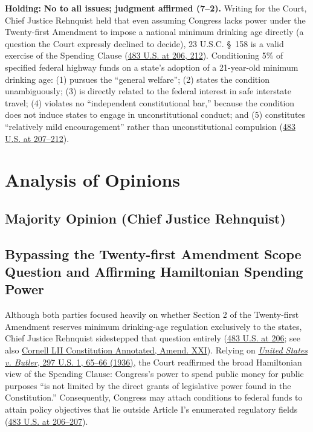 \documentclass[12pt]{article}
\begin{document}
\textbf{Holding:} \textbf{No to all issues; judgment affirmed (7--2).} Writing for the Court, Chief Justice Rehnquist held that even assuming Congress lacks power under the Twenty-first Amendment to impose a national minimum drinking age directly (a question the Court expressly declined to decide), 23 U.S.C. \S~158 is a valid exercise of the Spending Clause (\href{https://supreme.justia.com/cases/federal/us/483/203/}{483 U.S. at 206, 212}). Conditioning 5\% of specified federal highway funds on a state's adoption of a 21-year-old minimum drinking age: (1) pursues the ``general welfare''; (2) states the condition unambiguously; (3) is directly related to the federal interest in safe interstate travel; (4) violates no ``independent constitutional bar,'' because the condition does not induce states to engage in unconstitutional conduct; and (5) constitutes ``relatively mild encouragement'' rather than unconstitutional compulsion (\href{https://supreme.justia.com/cases/federal/us/483/203/}{483 U.S. at 207--212}).

\section{Analysis of Opinions}
\subsection{Majority Opinion (Chief Justice Rehnquist)}

\subsection{Bypassing the Twenty-first Amendment Scope Question and Affirming Hamiltonian Spending Power}

Although both parties focused heavily on whether Section 2 of the Twenty-first Amendment reserves minimum drinking-age regulation exclusively to the states, Chief Justice Rehnquist sidestepped that question entirely (\href{https://supreme.justia.com/cases/federal/us/483/203/}{483 U.S. at 206}; see also \href{https://www.law.cornell.edu/constitution-conan/amendment-21/state-and-federal-regulation-of-minimum-drinking-age}{Cornell LII Constitution Annotated, Amend. XXI}). Relying on \href{https://supreme.justia.com/cases/federal/us/297/1/}{\textit{United States v. Butler}, 297 U.S. 1, 65--66 (1936)}, the Court reaffirmed the broad Hamiltonian view of the Spending Clause: Congress's power to spend public money for public purposes ``is not limited by the direct grants of legislative power found in the Constitution.'' Consequently, Congress may attach conditions to federal funds to attain policy objectives that lie outside Article I's enumerated regulatory fields (\href{https://supreme.justia.com/cases/federal/us/483/203/}{483 U.S. at 206--207}).
\end{document}
